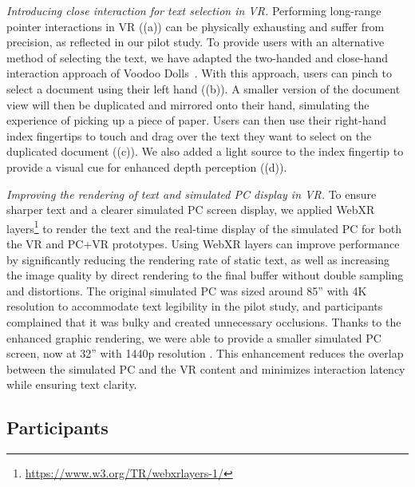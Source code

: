 \vspace{1mm}\noindent\textit{Introducing close interaction for text selection in VR.}
Performing long-range pointer interactions in VR ((a)) can be physically exhausting and suffer from precision, as reflected in our pilot study.
To provide users with an alternative method of selecting the text, we have adapted the two-handed and close-hand interaction approach of Voodoo Dolls~\cite{pierce1999voodoo}. With this approach, users can pinch to select a document using their left hand ((b)). 
A smaller version of the document view will then be duplicated and mirrored onto their hand, simulating the experience of picking up a piece of paper. Users can then use their right-hand index fingertips to touch and drag over the text they want to select on the duplicated document ((c)). 
We also added a light source to the index fingertip to provide a visual cue for enhanced depth perception ((d)).

\vspace{1mm}\noindent\textit{Improving the rendering of text and simulated PC display in VR.} 
To ensure sharper text and a clearer simulated PC screen display, we applied WebXR layers\footnote{\url{https://www.w3.org/TR/webxrlayers-1/}} to render the text and the real-time display of the simulated PC for both the VR and PC+VR prototypes.
Using WebXR layers can improve performance by significantly reducing the rendering rate of static text, as well as increasing the image quality by direct rendering to the final buffer without double sampling and distortions. 
The original simulated PC was sized around 85'' with 4K resolution to accommodate text legibility in the pilot study, and participants complained that it was bulky and created unnecessary occlusions. Thanks to the enhanced graphic rendering, we were able to provide a smaller simulated PC screen, now at 32'' with 1440p resolution . This enhancement reduces the overlap between the simulated PC and the VR content and minimizes interaction latency while ensuring text clarity.

\subsection{Participants}

